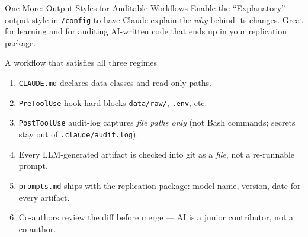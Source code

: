 \documentclass[aspectratio=169,10pt]{beamer}
\newcommand{\boristip}[1]{%
  \tikz[baseline=(X.base)]{\node[fill=level4,text=white,
  rounded corners=2pt,inner sep=2pt,font=\tiny\bfseries](X){TIP #1};}}
\begin{document}
\begin{frame}{One More: Output Styles for Auditable Workflows}
\small
\boristip{10} Enable the ``Explanatory'' output style in \texttt{/config} to
have Claude explain the \emph{why} behind its changes. Great for learning
and for auditing AI-written code that ends up in your replication package.

\vspace{0.4em}
\begin{block}{A workflow that satisfies all three regimes}
\small
\begin{enumerate}\itemsep1pt
    \item \texttt{CLAUDE.md} declares data classes and read-only paths.
    \item \texttt{PreToolUse} hook hard-blocks \texttt{data/raw/}, \texttt{.env}, etc.
    \item \texttt{PostToolUse} audit-log captures \emph{file paths only}
        (not Bash commands; secrets stay out of \texttt{.claude/audit.log}).
    \item Every LLM-generated artifact is checked into git as a \emph{file},
        not a re-runnable prompt.
    \item \texttt{prompts.md} ships with the replication package: model name,
        version, date for every artifact.
    \item Co-authors review the diff before merge --- AI is a junior contributor,
        not a co-author.
\end{enumerate}
\end{block}
\end{frame}
\end{document}
